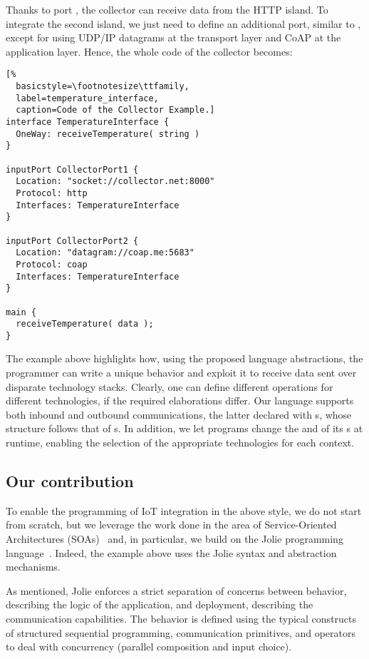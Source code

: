 Thanks to port , the collector can receive data from the
HTTP island. To integrate the second island, we just need to define an
additional port, similar to , except for using UDP/IP
datagrams at the transport layer and CoAP at the application layer. Hence, the
whole code of the collector becomes:
%
\begin{lstlisting}[%
  basicstyle=\footnotesize\ttfamily,
  label=temperature_interface, 
  caption=Code of the Collector Example.]
interface TemperatureInterface {
  OneWay: receiveTemperature( string )
}

inputPort CollectorPort1 {
  Location: "socket://collector.net:8000"
  Protocol: http
  Interfaces: TemperatureInterface
}

inputPort CollectorPort2 {
  Location: "datagram://coap.me:5683"
  Protocol: coap
  Interfaces: TemperatureInterface
}

main {
  receiveTemperature( data );
}
\end{lstlisting}
%
The example above highlights how, using the proposed language abstractions, the
programmer can write a unique behavior and exploit it to receive data sent over
disparate technology stacks. Clearly, one can define different operations for
different technologies, if the required elaborations differ. Our language
supports both inbound and outbound communications, the latter declared with
s, whose structure follows that of s. In
addition, we let programs change the  and  of its
s at runtime, enabling the selection of the appropriate
technologies for each context.

\subsection{Our contribution}
\label{sub:aim_of_research}

To enable the programming of IoT integration in the above style, we do not start
from scratch, but we leverage the work done in the area of Service-Oriented
Architectures (SOAs)~\cite{Erl07} and, in particular, we build on the Jolie
programming language~\cite{MONTESI200719,MGZ07,jolie-lang}. Indeed, the example
above uses the Jolie syntax and abstraction mechanisms.

As mentioned, Jolie enforces a strict separation of concerns between behavior,
describing the logic of the application, and deployment, describing the
communication capabilities. The behavior is defined using the typical constructs
of structured sequential programming, communication primitives, and operators to
deal with concurrency (parallel composition and input choice).

